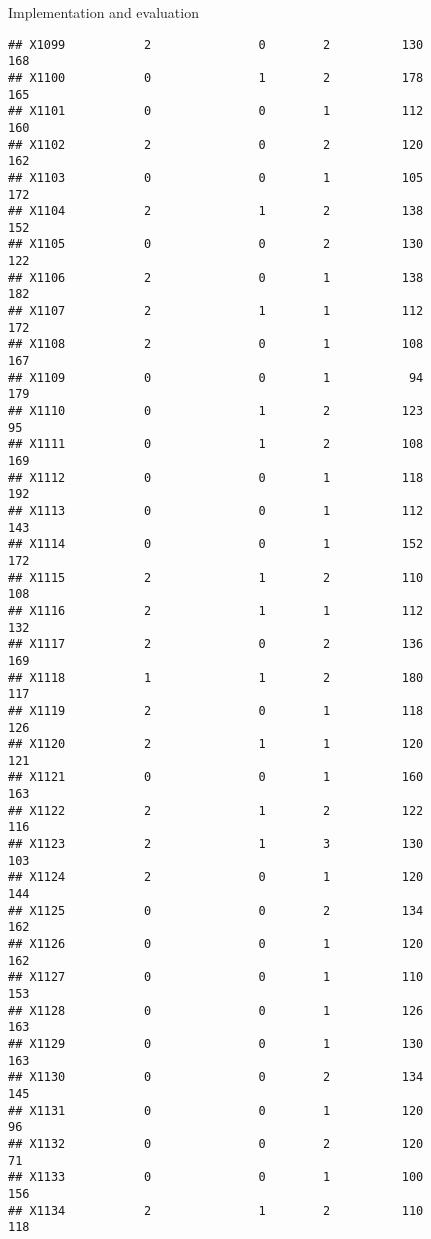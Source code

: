 \documentclass[
  ignorenonframetext,
]{beamer}
\begin{document}
\begin{frame}[fragile]{Implementation and evaluation}
\begin{verbatim}
## X1099           2               0        2          130            168
## X1100           0               1        2          178            165
## X1101           0               0        1          112            160
## X1102           2               0        2          120            162
## X1103           0               0        1          105            172
## X1104           2               1        2          138            152
## X1105           0               0        2          130            122
## X1106           2               0        1          138            182
## X1107           2               1        1          112            172
## X1108           2               0        1          108            167
## X1109           0               0        1           94            179
## X1110           0               1        2          123             95
## X1111           0               1        2          108            169
## X1112           0               0        1          118            192
## X1113           0               0        1          112            143
## X1114           0               0        1          152            172
## X1115           2               1        2          110            108
## X1116           2               1        1          112            132
## X1117           2               0        2          136            169
## X1118           1               1        2          180            117
## X1119           2               0        1          118            126
## X1120           2               1        1          120            121
## X1121           0               0        1          160            163
## X1122           2               1        2          122            116
## X1123           2               1        3          130            103
## X1124           2               0        1          120            144
## X1125           0               0        2          134            162
## X1126           0               0        1          120            162
## X1127           0               0        1          110            153
## X1128           0               0        1          126            163
## X1129           0               0        1          130            163
## X1130           0               0        2          134            145
## X1131           0               0        1          120             96
## X1132           0               0        2          120             71
## X1133           0               0        1          100            156
## X1134           2               1        2          110            118

\end{verbatim}
\end{frame}
\end{document}
